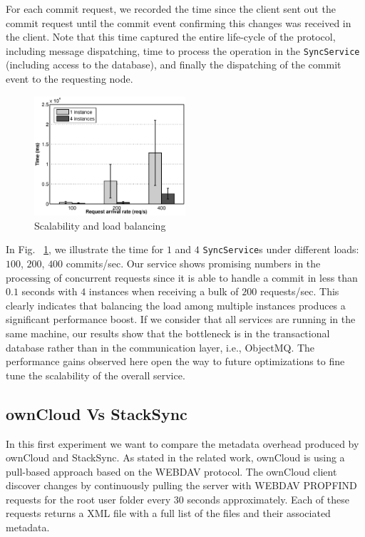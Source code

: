 For each commit request, we recorded the time since the client sent out the commit request until the commit event 
confirming this changes was received in the client. Note that this time captured the entire life-cycle of the protocol,
including message dispatching, time to process the operation in the \texttt{SyncService}
(including access to the database), and finally the dispatching of the commit event to the requesting node.

\begin{figure}[t]
\centering
\includegraphics[width=0.5\textwidth]{figures/performance_scalability}
\caption{Scalability and load balancing}\label{fig:scalability}
\end{figure}


In Fig. ~\ref{fig:scalability}, we illustrate the time for $1$ and $4$ \texttt{SyncService}s under different
loads: $100$, $200$, $400$ commits/sec. Our service shows promising numbers in the processing of concurrent
requests since it is able to handle a commit in less than $0.1$ seconds with $4$ instances when receiving
a bulk of $200$ requests/sec. This clearly indicates that balancing the load
among multiple instances produces a significant performance boost. If we consider that all services are
running in the same machine, our results show that the bottleneck is in the transactional database
rather than in the communication layer, i.e., ObjectMQ. The performance gains observed here open the
way to future optimizations to fine tune the scalability of the overall service. 





\subsection{ownCloud Vs StackSync}

In this first experiment we want to compare the metadata overhead produced by ownCloud and StackSync. As stated in the related work, ownCloud is using a pull-based approach based on the WEBDAV protocol. The ownCloud client discover changes by continuously pulling the server with WEBDAV PROPFIND requests for the root user folder every 30 seconds approximately. Each of these requests returns a XML file with a full list of the files and their associated metadata.


